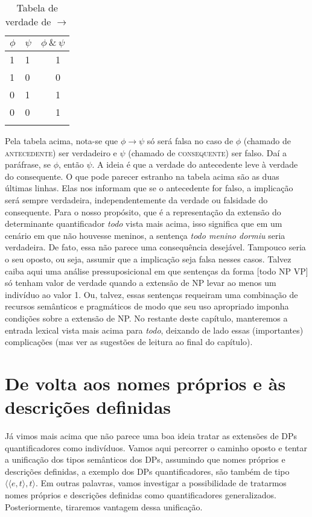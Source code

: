 \begin{table}
	\begin{tabularx}{.4\textwidth}{XXX}
		\lsptoprule
		$\phi$ & $\psi$ & $\phi\ \&\ \psi$ \\
		\midrule 
		1 & 1 & \ \ \ 1 \\  
		1 & 0 & \ \ \ 0 \\ 
		0 & 1 & \ \ \ 1 \\ 
		0 & 0 & \ \ \ 1 \\
		\lspbottomrule
	\end{tabularx}
	\caption{Tabela de verdade de $\rightarrow$}
	\label{tabelase}
\end{table}



\n Pela tabela acima, nota-se que $\phi \rightarrow \psi$ só será falsa no caso de $\phi$ (chamado de \textsc{antecedente}) ser verdadeiro e $\psi$ (chamado de \textsc{consequente}) ser falso. Daí a paráfrase, se $\phi$, então $\psi$. A ideia é que a verdade do antecedente leve à verdade do consequente. O que pode parecer estranho na tabela acima são as duas últimas linhas. Elas nos informam que se o antecedente for falso, a implicação será sempre verdadeira, independentemente da verdade ou falsidade do consequente. Para o nosso propósito, que é a representação da extensão do determinante quantificador \textit{todo} vista mais acima, isso significa que em um cenário em que não houvesse meninos, a sentença \textit{todo menino dormiu} seria verdadeira. De fato, essa não parece uma consequência desejável. Tampouco seria o seu oposto, ou seja, assumir que a implicação seja falsa nesses casos. Talvez caiba aqui uma análise pressuposicional em que sentenças da forma [todo NP VP] só tenham valor de verdade quando a extensão de NP levar ao menos um indivíduo ao valor 1. Ou, talvez, essas sentenças requeiram uma combinação de recursos semânticos e pragmáticos de modo que seu uso apropriado imponha condições sobre a extensão de NP. No restante deste capítulo, manteremos a entrada lexical vista mais acima para \textit{todo}, deixando de lado essas (importantes) complicações (mas ver as sugestões de leitura ao final do capítulo). 

\section{De volta aos nomes próprios e às descrições definidas}

Já vimos mais acima que não parece uma boa ideia tratar as
extensões de DPs quantificadores como indivíduos. Vamos aqui percorrer o caminho oposto e tentar a unificação dos tipos semânticos
dos DPs, assumindo que nomes próprios e descrições definidas, a
exemplo dos DPs quantificadores, são também de tipo
$\langle\langle e,t\rangle,t\rangle$. Em outras palavras, vamos investigar a
possibilidade de tratarmos nomes próprios e descrições definidas
como quantificadores generalizados. Posteriormente, tiraremos vantagem dessa unificação.

